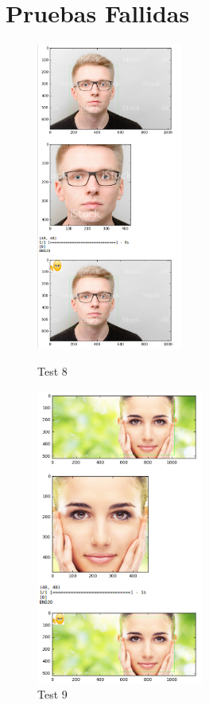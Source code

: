 \section{Pruebas Fallidas}
\begin{frame}

\begin{figure}[!htbp]
    
    \begin{multicols}{2}
     \includegraphics[angle=0,width=48mm]{Imagenes/test8.png}
       \caption{Test 8}
       \label{fig:test8}   
       
       \includegraphics[angle=0,width=55mm]{Imagenes/test9.png}
           \caption{Test 9}
           \label{fig:test9} 
           
    \end{multicols}
        
\end{figure}
\end{frame}


